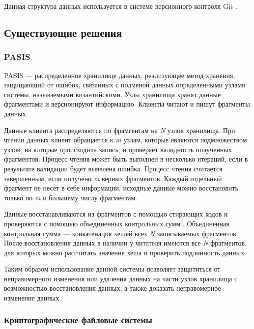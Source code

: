 Данная структура данных используется в системе версионного контроля Git \cite{git}.

\subsection{Существующие решения}

\label{par:mainanal}

\subsubsection{PASIS}

\label{par:pasis}

PASIS \cite{pasis} --- распределенное хранилище данных, реализующее метод хранения, защищающий от ошибок, связанных с подменой данных определенными узлами системы, называемыми византийскими. Узлы хранилища хранят данные фрагментами и версионируют информацию. Клиенты читают и пишут фрагменты данных.

Данные клиента распределяются по фрамгентам на \textit{N} узлов хранилища. При чтении данных клиент обращается к \textit{m} узлам, которые являются подмножеством узлов, на которые происходила запись, и проверяет валидность полученных фрагментов. Процесс чтения может быть выполнен в несколько итераций, если в результате валидации будет выявлена ошибка. Процесс чтения считается завершенным, если получено \textit{m} верных фрагментов. Каждый отдельный фрагмент не несет в себе информации, исходные данные можно восстановить только по \textit{m} и большему числу фрагментам.

Данные восстанавливаются из фрагментов с помощью стирающих кодов \cite{erasurecode} и проверяются с помощью объединенных контрольных сумм \cite{pasis}. Объединенная контрольная сумма --- конкатенация хешей всех \textit{N} записываемых фрагментов. После восстановления данных в наличии у читателя имеются все \textit{N} фрагментов, для которых можно рассчитать значение хеша и проверить подлинность данных.

Таким образом использование данной системы позволяет защититься от неправомерного изменения или удаления данных на части узлов хранилища с возможностью восстановления данных, а также доказать неправомерное изменение данных.

\subsubsection{Криптографические файловые системы}


